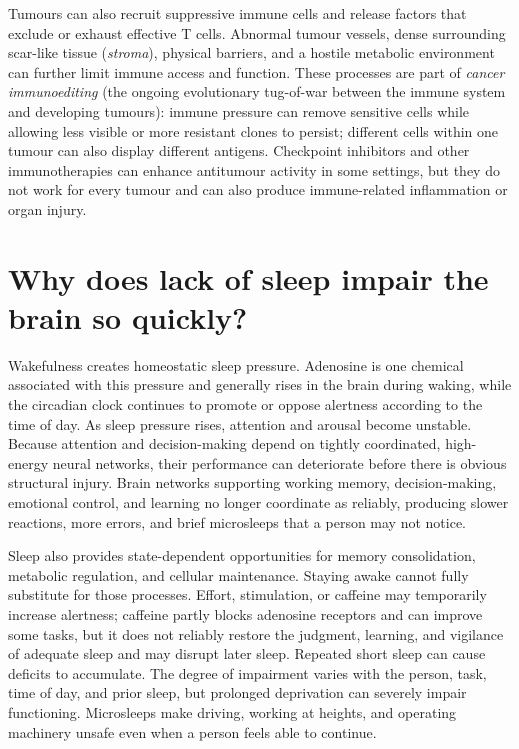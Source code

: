 \documentclass[11pt,oneside]{report}
\begin{document}
Tumours can also recruit suppressive immune cells and release factors that
exclude or exhaust effective T cells. Abnormal tumour vessels, dense
surrounding scar-like tissue (\emph{stroma}), physical barriers, and a hostile
metabolic environment can further limit immune access and function. These
processes are part of \emph{cancer immunoediting} (the ongoing evolutionary
tug-of-war between the immune system and developing tumours): immune pressure
can remove sensitive cells while allowing less visible or more resistant clones
to persist; different cells within one tumour can also display different
antigens. Checkpoint inhibitors and other immunotherapies
can enhance antitumour activity in some settings, but they do not work for
every tumour and can also produce immune-related inflammation or organ injury.

\section{Why does lack of sleep impair the brain so quickly?}

Wakefulness creates homeostatic sleep pressure. Adenosine is one chemical
associated with this pressure and generally rises in the brain during waking,
while the circadian clock continues to promote or oppose alertness according
to the time of day. As sleep pressure rises, attention and arousal become
unstable. Because attention and decision-making depend on tightly coordinated,
high-energy neural networks, their performance can deteriorate before there is
obvious structural injury. Brain networks supporting working memory,
decision-making, emotional control, and learning no longer coordinate as
reliably, producing slower
reactions, more errors, and brief microsleeps that a person may not notice.

Sleep also provides state-dependent opportunities for memory consolidation,
metabolic regulation, and cellular maintenance. Staying awake cannot fully
substitute for those processes. Effort, stimulation, or caffeine may temporarily
increase alertness; caffeine partly blocks adenosine receptors and can improve
some tasks, but it does not reliably restore the judgment, learning, and
vigilance of adequate sleep and may disrupt later sleep. Repeated short sleep
can cause deficits to accumulate. The degree of impairment varies with the
person, task, time of day, and prior sleep, but prolonged deprivation can
severely impair functioning. Microsleeps make driving, working at heights, and
operating machinery unsafe even when a person feels able to continue.
\end{document}
